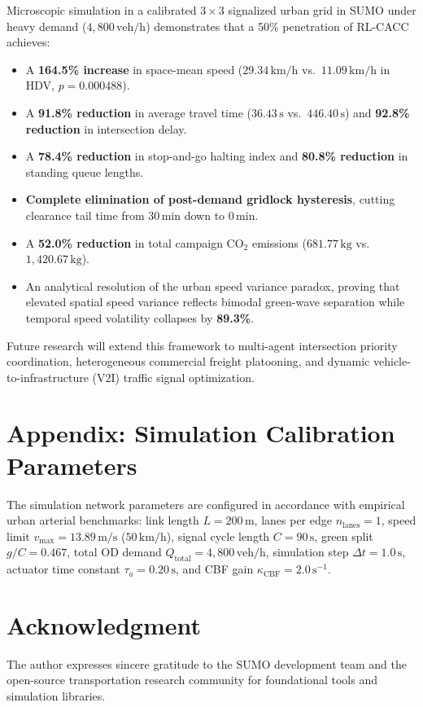 \documentclass[11pt,a4paper]{article}
\begin{document}
Microscopic simulation in a calibrated $3\times3$ signalized urban grid in SUMO under heavy demand ($4{,}800\,\text{veh/h}$) demonstrates that a 50\% penetration of RL-CACC achieves:
\begin{itemize}
    \item A \textbf{164.5\% increase} in space-mean speed ($29.34\,\text{km/h}$ vs.\ $11.09\,\text{km/h}$ in HDV, $p = 0.000488$).
    \item A \textbf{91.8\% reduction} in average travel time ($36.43\,\text{s}$ vs.\ $446.40\,\text{s}$) and \textbf{92.8\% reduction} in intersection delay.
    \item A \textbf{78.4\% reduction} in stop-and-go halting index and \textbf{80.8\% reduction} in standing queue lengths.
    \item \textbf{Complete elimination of post-demand gridlock hysteresis}, cutting clearance tail time from $30\,\mathrm{min}$ down to $0\,\mathrm{min}$.
    \item A \textbf{52.0\% reduction} in total campaign $\text{CO}_2$ emissions ($681.77\,\text{kg}$ vs.\ $1{,}420.67\,\text{kg}$).
    \item An analytical resolution of the urban speed variance paradox, proving that elevated spatial speed variance reflects bimodal green-wave separation while temporal speed volatility collapses by \textbf{89.3\%}.
\end{itemize}

Future research will extend this framework to multi-agent intersection priority coordination, heterogeneous commercial freight platooning, and dynamic vehicle-to-infrastructure (V2I) traffic signal optimization.

\section*{Appendix: Simulation Calibration Parameters}
The simulation network parameters are configured in accordance with empirical urban arterial benchmarks:
link length $L = 200\,\mathrm{m}$, lanes per edge $n_{\text{lanes}} = 1$, speed limit $v_{\max} = 13.89\,\mathrm{m/s}$ ($50\,\mathrm{km/h}$), signal cycle length $C = 90\,\mathrm{s}$, green split $g/C = 0.467$, total OD demand $Q_{\text{total}} = 4{,}800\,\text{veh/h}$, simulation step $\Delta t = 1.0\,\mathrm{s}$, actuator time constant $\tau_a = 0.20\,\mathrm{s}$, and CBF gain $\kappa_{\text{CBF}} = 2.0\,\mathrm{s}^{-1}$.

\section*{Acknowledgment}
The author expresses sincere gratitude to the SUMO development team and the open-source transportation research community for foundational tools and simulation libraries.



\end{document}
